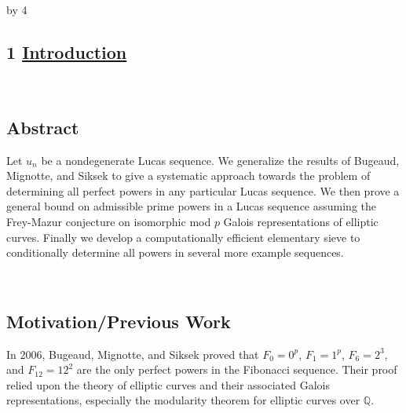 \documentclass[14pt]{scrartcl}
\def\Q{{\mathbb Q}}
\def\anzspalten{4}
\newlength{\kastenwidth}
\newenvironment{kasten}{%
  \begin{lrbox}{\dummybox}%
    \begin{minipage}{0.96\linewidth}}%
    {\end{minipage}%
  \end{lrbox}%
  \raisebox{-\depth}{\psshadowbox[framesep=1em]{\usebox{\dummybox}}}\\[0.5em]}
\newenvironment{spalte}{%
  \setlength\kastenwidth{1.2\textwidth}
  \divide\kastenwidth by \anzspalten
  \begin{minipage}[t]{\kastenwidth}}{\end{minipage}\hfill}
\begin{document}
\begin{lrbox}{\spalten}
  \parbox[t][\textheight]{1.3\textwidth}{%
    \hfill
    \begin{spalte}
\vspace{-3.4in}
      \begin{kasten}
\section*{1 \hspace{0.1cm} {\color{red} \underline{Introduction}}}
\end{kasten}

\begin{kasten}
\subsection*{\color{blue} Abstract}
{
Let $u_n$ be a nondegenerate Lucas sequence.  We generalize the results of Bugeaud, Mignotte, and Siksek \cite{siksek06} to give a systematic approach towards the problem of determining all perfect powers in any particular Lucas sequence.  We then prove a general bound on admissible prime powers in a Lucas sequence assuming the Frey-Mazur conjecture on isomorphic mod $p$ Galois representations of elliptic curves.  Finally we develop a computationally efficient elementary sieve to conditionally determine all powers in several more example sequences.
} 
\end{kasten}

\begin{kasten}

\subsection*{\color{blue} Motivation/Previous Work}
In 2006, Bugeaud, Mignotte, and Siksek proved that
$F_0=0^p$, $F_1=1^p$, $F_6=2^3$, and $F_{12} = 12^2$ are the only perfect powers in the Fibonacci sequence.  Their proof relied upon the theory of elliptic curves and their associated Galois representations, especially the modularity theorem for elliptic curves over $\Q$.

\end{kasten}

\begin{kasten}


\end{kasten}
\end{spalte}}
\end{lrbox}
\end{document}
